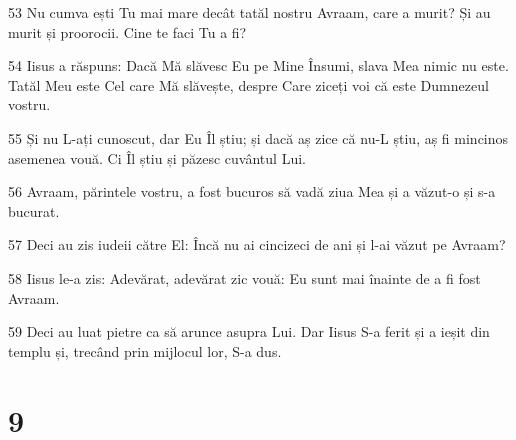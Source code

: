 \par 53 Nu cumva ești Tu mai mare decât tatăl nostru Avraam, care a murit? Și au murit și proorocii. Cine te faci Tu a fi?
\par 54 Iisus a răspuns: Dacă Mă slăvesc Eu pe Mine Însumi, slava Mea nimic nu este. Tatăl Meu este Cel care Mă slăvește, despre Care ziceți voi că este Dumnezeul vostru.
\par 55 Și nu L-ați cunoscut, dar Eu Îl știu; și dacă aș zice că nu-L știu, aș fi mincinos asemenea vouă. Ci Îl știu și păzesc cuvântul Lui.
\par 56 Avraam, părintele vostru, a fost bucuros să vadă ziua Mea și a văzut-o și s-a bucurat.
\par 57 Deci au zis iudeii către El: Încă nu ai cincizeci de ani și l-ai văzut pe Avraam?
\par 58 Iisus le-a zis: Adevărat, adevărat zic vouă: Eu sunt mai înainte de a fi fost Avraam.
\par 59 Deci au luat pietre ca să arunce asupra Lui. Dar Iisus S-a ferit și a ieșit din templu și, trecând prin mijlocul lor, S-a dus.

\chapter{9}


